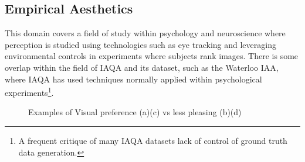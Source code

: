 \subsection{Empirical Aesthetics}

This domain covers a field of study within psychology and neuroscience where perception is studied using technologies such as eye tracking\cite{Younes2016} and leveraging environmental controls in experiments where subjects rank images. There is some overlap within the field of IAQA and its dataset, such as the Waterloo IAA\cite{Liu2017a}, where IAQA has used techniques normally applied within psychological experiments\footnote{A frequent critique of many IAQA datasets lack of control of ground truth data generation.}. 

\par


\begin{figure}[htp!]
\centering
{}
\caption{Examples of Visual preference (a)(c) vs less pleasing (b)(d) \cite{Bar2006}}
\label{fig:curve}
\end{figure}

